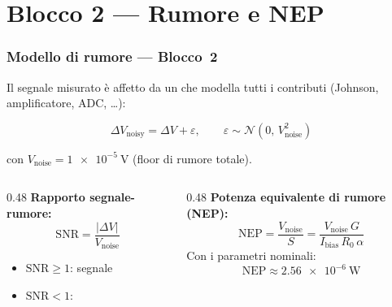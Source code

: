 
\section{Blocco 2 --- Rumore e NEP}

\begin{frame}
\frametitle{Modello di rumore --- Blocco~2}

Il segnale misurato \`e affetto da un 
che modella tutti i contributi (Johnson, amplificatore, ADC, \ldots):

\[
  \Delta V_\text{noisy} = \Delta V + \varepsilon, \qquad
  \varepsilon \sim \mathcal{N}(0,\, V_\text{noise}^2)
\]

con $V_\text{noise} = \SI{1e-5}{\volt}$ (floor di rumore totale).

\vspace{0.4em}
\begin{columns}[T]
  \begin{column}{0.48\textwidth}
    \textbf{Rapporto segnale-rumore:}
    \[
      \mathrm{SNR} = \frac{|\Delta V|}{V_\text{noise}}
    \]
    \begin{itemize}
      \item $\mathrm{SNR} \geq 1$: segnale 
      \item $\mathrm{SNR} < 1$: 
    \end{itemize}
  \end{column}
  \begin{column}{0.48\textwidth}
    \textbf{Potenza equivalente di rumore (NEP):}
    \[
      \mathrm{NEP} = \frac{V_\text{noise}}{S}
                   = \frac{V_\text{noise}\,G}{I_\text{bias}\,R_0\,\alpha}
    \]
    Con i parametri nominali:
    \[
      \mathrm{NEP} \approx \SI{2.56e-6}{\watt}
    \]
  \end{column}
\end{columns}

\end{frame}

